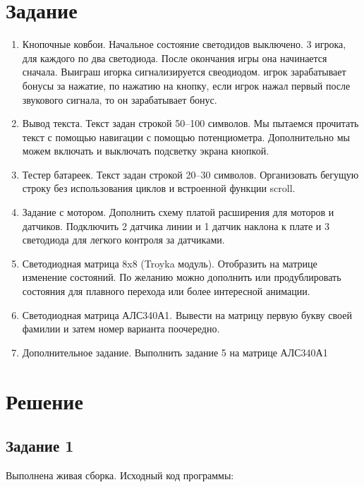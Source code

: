 \documentclass[a4paper,14pt]{extarticle}
\begin{document}
  \section*{\hspace{12.5mm}Задание}
  \begin{enumerate}
    \item Кнопочные ковбои. Начальное состояние светодидов выключено. 3 игрока, для каждого по два светодиода. После окончания игры она начинается сначала. Выиграш игорка сигнализируется свеодиодом. игрок зарабатывает бонусы за нажатие, по нажатию на кнопку, если игрок нажал первый после звукового сигнала, то он зарабатывает бонус.
    \item Вывод текста. Текст задан строкой 50–100 символов. Мы пытаемся прочитать текст с помощью навигации с помощью потенциометра. Дополнительно мы можем включать и выключать подсветку экрана кнопкой.
    \item Тестер батареек. Текст задан строкой 20–30 символов. Организовать бегущую строку без использования циклов и встроенной функции scroll.
    \item Задание с мотором. Дополнить схему платой расширения для моторов и датчиков. Подключить 2 датчика линии и 1 датчик наклона к плате и 3 светодиода для легкого контроля за датчиками.
    \item Светодиодная матрица 8x8 (Troyka модуль). Отобразить на матрице изменение состояний. По желанию можно дополнить или продублировать состояния для плавного перехода или более интересной анимации.
    \item Светодиодная матрица АЛС340А1. Вывести на матрицу первую букву своей фамилии и затем номер варианта поочередно.
    \item Дополнительное задание. Выполнить задание 5 на матрице АЛС340А1
  \end{enumerate}

  \newpage
  \section*{\hspace{12.5mm}Решение}
  \subsection*{\hspace{12.5mm}Задание 1}
  Выполнена живая сборка. Исходный код программы:
\end{document}
